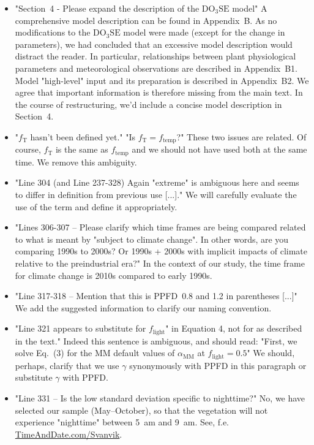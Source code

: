 \documentclass{scrartcl}
\begin{document}
\begin{itemize}
    \item {\color{blue} "Section~4 - Please expand the description of the $\mathrm{DO_3SE}$ model"} A comprehensive model description can be found in Appendix~B. As no modifications to the $\mathrm{DO_3SE}$ model were made (except for the change in parameters), we had concluded that an excessive model description would distract the reader. In particular, relationships between plant physiological parameters and meteorological observations are described in Appendix~B1. Model "high-level" input and its preparation is described in Appendix~B2. We agree that important information is therefore missing from the main text. In the course of restructuring, we'd include a concise model description in Section~4.
    \item {\color{blue} "$f_\mathrm{T}$ hasn't been defined yet." "Is $f_\mathrm{T} = f_\mathrm{temp}$?"} These two issues are related. Of course, $f_\mathrm{T}$ is the same as $f_\mathrm{temp}$ and we should not have used both at the same time. We remove this ambiguity.
    \item {\color{blue} "Line 304 (and Line 237-328) Again "extreme" is ambiguous here and seems to differ in definition from previous use [...]."} We will carefully evaluate the use of the term and define it appropriately.
    \item {\color{blue} "Lines 306-307 -- Please clarify which time frames are being compared related to what is meant by "subject to climate change". In other words, are you comparing 1990s to 2000s? Or 1990s + 2000s with implicit impacts of climate relative to the preindustrial era?"} In the context of our study, the time frame for climate change is 2010s compared to early 1990s.
    \item {\color{blue} "Line 317-318 -- Mention that this is PPFD~0.8 and 1.2 in parentheses [...]"} We add the suggested information to clarify our naming convention.
    \item {\color{blue} "Line 321 appears to substitute for $f_\mathrm{light}$" in Equation 4, not for as described in the text."} Indeed this sentence is ambiguous, and should read: "First, we solve Eq.~(3) for the MM default values of $\alpha_\mathrm{MM}$ at $f_\mathrm{light}=0.5$" We should, perhaps, clarify that we use $\gamma$ synonymously with PPFD in this paragraph or substitute $\gamma$ with PPFD.
    \item {\color{blue} "Line 331 -- Is the low standard deviation specific to nighttime?"} No, we have selected our sample (May--October), so that the vegetation will not experience "nighttime" between 5~am and 9~am. See, f.e. \href{https://www.timeanddate.com/sun/@777232}{TimeAndDate.com/Svanvik}.

\end{itemize}
\end{document}
